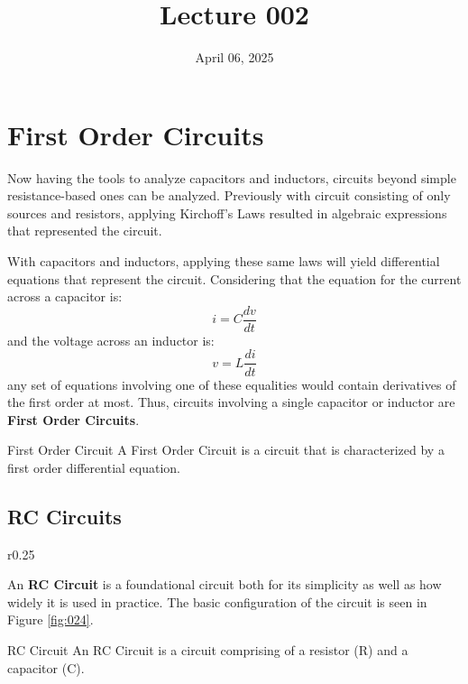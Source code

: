 \documentclass[12pt]{article}
\title{Lecture 002}
\date{April 06, 2025}
\begin{document}
\newpage
\section{First Order Circuits}
\label{sec:firstOrderCircuits}

Now having the tools to analyze capacitors and inductors, circuits beyond simple resistance-based ones can be analyzed. Previously with circuit consisting of only sources and resistors, applying Kirchoff's Laws resulted in algebraic expressions that represented the circuit.

With capacitors and inductors, applying these same laws will yield differential equations that represent the circuit. Considering that the equation for the current across a capacitor is:
\begin{equation*}
  i = C\frac{dv}{dt}
\end{equation*}
and the voltage across an inductor is:
\begin{equation*}
  v = L\frac{di}{dt}
\end{equation*}
any set of equations involving one of these equalities would contain derivatives of the first order at most. Thus, circuits involving a single capacitor or inductor are \textbf{First Order Circuits}.

\begin{definition}{First Order Circuit}
  A First Order Circuit is a circuit that is characterized by a first order differential equation.
\end{definition}

\subsection{RC Circuits}
\label{ssec:rcCircuits}

\begin{wrapfigure}[4]{r}{0.25\textwidth}
  \centering
  
  \caption{RC Circuit}
  \label{fig:024}
\end{wrapfigure}

An \textbf{RC Circuit} is a foundational circuit both for its simplicity as well as how widely it is used in practice. The basic configuration of the circuit is seen in Figure \ref{fig:024}.

\begin{definition}{RC Circuit}
  An RC Circuit is a circuit comprising of a resistor (R) and a capacitor (C).
\end{definition}
\end{document}
